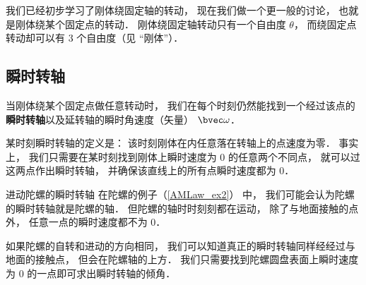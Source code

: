 

我们已经初步学习了刚体绕固定轴的转动， 现在我们做一个更一般的讨论， 也就是刚体绕某个固定点的转动． 刚体绕固定轴转动只有一个自由度 $\theta$， 而绕固定点转动却可以有 3 个自由度（见 “刚体”）．

\subsection{瞬时转轴}
当刚体绕某个固定点做任意转动时， 我们在每个时刻仍然能找到一个经过该点的\textbf{瞬时转轴}以及延转轴的瞬时角速度（矢量） $\bvec \omega$．

某时刻瞬时转轴的定义是： 该时刻刚体在内任意落在转轴上的点速度为零． 事实上， 我们只需要在某时刻找到刚体上瞬时速度为 0 的任意两个不同点， 就可以过这两点作出瞬时转轴， 并确保该直线上的所有点瞬时速度都为 0．

\begin{example}{进动陀螺的瞬时转轴}\label{ITensr_ex2}
在陀螺的例子（\autoref{AMLaw_ex2}） 中， 我们可能会认为陀螺的瞬时转轴就是陀螺的轴． 但陀螺的轴时时刻刻都在运动， 除了与地面接触的点外， 任意一点的瞬时速度都不为 0．

如果陀螺的自转和进动的方向相同， 我们可以知道真正的瞬时转轴同样经经过与地面的接触点， 但会在陀螺轴的上方． 我们只需要找到陀螺圆盘表面上瞬时速度为 0 的一点即可求出瞬时转轴的倾角．
\end{example}

